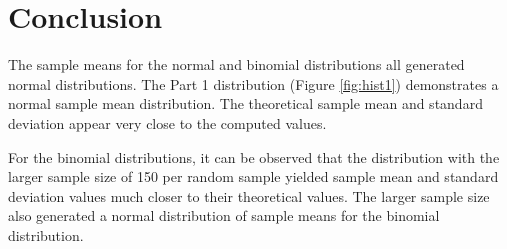 \documentclass{article}
\begin{document}
    \clearpage

    \section{Conclusion}
    The sample means for the normal and binomial distributions all generated normal distributions. The Part 1 distribution (Figure \ref{fig:hist1}) demonstrates a normal sample mean distribution. The theoretical sample mean and standard deviation appear very close to the computed values.

    For the binomial distributions, it can be observed that the distribution with the larger sample size of 150 per random sample yielded sample mean and standard deviation values much closer to their theoretical values. The larger sample size also generated a normal distribution of sample means for the binomial distribution.

    \clearpage
    \newpage
\end{document}

